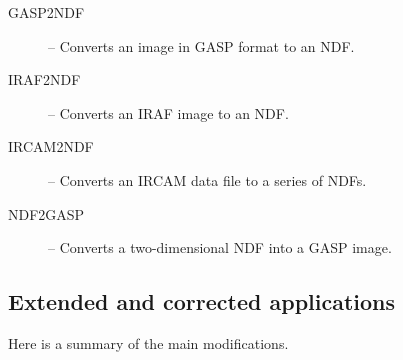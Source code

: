 \begin{description}
   \item [GASP2NDF] -- Converts an image in GASP format to an NDF.
   \item [IRAF2NDF] -- Converts an IRAF image to an NDF.
   \item [IRCAM2NDF] -- Converts an IRCAM data file to a series of NDFs.
   \item [NDF2GASP] -- Converts a two-dimensional NDF into a GASP image.
\end{description}

\subsection{Extended and corrected applications}
  
Here is a summary of the main modifications.
